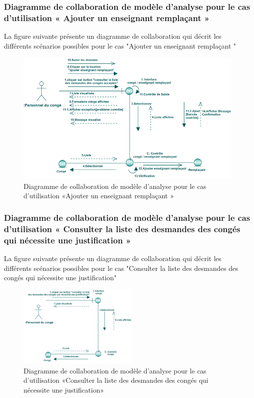 \documentclass[12 pt ]{report}
\begin{document}
\subsubsection{Diagramme  de  collaboration  de  modèle  d'analyse  pour  le  cas  d'utilisation « Ajouter un enseignant remplaçant »  }
La figure suivante présente un diagramme de collaboration qui décrit les différents
scénarios possibles pour le cas "Ajouter un enseignant remplaçant "
\begin{figure}[h]
\begin{center}
\includegraphics[width= 14 cm , height =6 cm]{col_ajo_rem.PNG}
 \caption{Diagramme  de  collaboration  de  modèle  d'analyse  pour  le  cas  d'utilisation «Ajouter un enseignant remplaçant »}
\end{center}
\end{figure} 
\subsubsection{Diagramme  de  collaboration  de  modèle  d'analyse  pour  le  cas  d'utilisation « Consulter la liste des desmandes des congés qui nécessite une justification »  }
La figure suivante présente un diagramme de collaboration qui décrit les différents
scénarios possibles pour le cas "Consulter la liste des desmandes des congés qui nécessite une justification"
\begin{figure}[h]
\begin{center}
\includegraphics[width= 12 cm , height =4cm]{colla_con_jus.PNG}
 \caption{Diagramme  de  collaboration  de  modèle  d'analyse  pour  le  cas  d'utilisation «Consulter la liste des desmandes des congés qui nécessite une justification»}
\end{center}
\end{figure}
\end{document}
